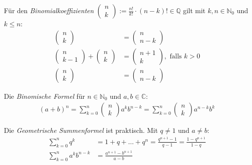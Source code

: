\documentclass{panikzettel}
\newcommand{\N}{\mathbb{N}}
\newcommand{\Q}{\mathbb{Q}}
\begin{document}
Für den \emph{Binomialkoeffizienten} $\begin{pmatrix} n \\ k \end{pmatrix} := \frac{n!}{k!} \cdot (n-k)! \in \Q$ gilt mit $k,n \in \N_0$ und $k \leq n$:
\begin{align*}
  \begin{pmatrix} n \\ k \end{pmatrix} &= \begin{pmatrix} n \\ n - k \end{pmatrix} \\
  \begin{pmatrix} n \\ k - 1 \end{pmatrix} + \begin{pmatrix} n \\ k \end{pmatrix} &= \begin{pmatrix} n + 1 \\ k \end{pmatrix}, \text{ falls } k > 0 \\
  \begin{pmatrix} n \\ k \end{pmatrix} &= \begin{pmatrix} n \\ n - k \end{pmatrix}
\end{align*}

Die \emph{Binomische Formel} für $n \in \N_0$ und $a,b \in \mathbb{C}$:
\begin{align*}
  (a + b)^n = \sum_{k=0}^n \begin{pmatrix} n \\ k \end{pmatrix} a^k b^{n-k} = \sum_{k=0}^n \begin{pmatrix} n \\ k \end{pmatrix} a^{n-k} b^k
\end{align*}

Die \emph{Geometrische Summenformel} ist praktisch. Mit $q \neq 1$ und $a \neq b$:
\begin{align*}
  \sum_{k=0}^n q^k &= 1 + q + \ldots + q^n = \frac{q^{n+1}-1}{q-1} = \frac{1-q^{n+1}}{1-q} \\
  \sum_{k=0}^n a^k b^{n-k} &= \frac{a^{n+1}-b^{n+1}}{a-b}
\end{align*}
\end{document}
